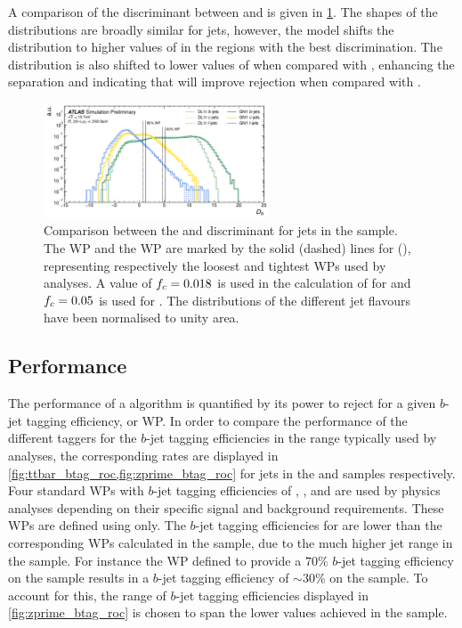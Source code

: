 A comparison of the \btag discriminant \Db between \DLr and \GNN is given in \cref{fig:ttbar_btag_disc}. 
The shapes of the distributions are broadly similar for \bcl jets, however, the \GNN model shifts the \bjet distribution to higher values of \Db in the regions with the best discrimination.
The \GNN \cjet distribution is also shifted to lower values of \Db when compared with \DLr, enhancing the separation and indicating that \GNN will improve \cjet rejection when compared with \DLr.

\begin{figure}[!htb]
    \centering
    \includegraphics[width=0.6\textwidth]{chapters/gnn_tagger/figs/results/main/ttbar/ttbar_score_DL1r_GN120220509_btag.pdf}
    \caption{Comparison between the \DLr and \GNN \btag discriminant \Db for jets in the \ttbar sample.
    The  WP and the  WP are marked by the solid (dashed) lines for \GNN (\DLr), representing respectively the loosest and tightest WPs used by analyses.
    A value of $f_c = 0.018$ is used in the calculation of \Db for \DLr and $f_c = 0.05$ is used for \GNN. The distributions of the different jet flavours have been normalised to unity area.}
    \label{fig:ttbar_btag_disc}
\end{figure}



\subsection{\texorpdfstring{\btagging}{b-tagging} Performance}\label{sec:gnn_btag_perf}

The performance of a \btag algorithm is quantified by its power to reject \cljets for a given $b$-jet tagging efficiency, or WP. 
In order to compare the \btag performance of the different taggers for the $b$-jet tagging efficiencies in the range typically used by analyses, the corresponding \clrej rates are displayed in \cref{fig:ttbar_btag_roc,fig:zprime_btag_roc} for jets in the \ttbar and \Zprime samples respectively.
Four standard WPs with $b$-jet tagging efficiencies of , ,  and  are used by physics analyses depending on their specific signal and background requirements.
These WPs are defined using \ttbarjets only.
The $b$-jet tagging efficiencies for \Zprimejets are lower than the corresponding WPs calculated in the \ttbar sample, due to the much higher jet \pt range in the \Zprime sample.
For instance the WP defined to provide a $70\%$ $b$-jet tagging efficiency on the \ttbar sample results in a $b$-jet tagging efficiency of $\sim30\%$ on the \Zprime sample.
To account for this, the range of $b$-jet tagging efficiencies displayed in \cref{fig:zprime_btag_roc} is chosen to span the lower values achieved in the \Zprime sample.

